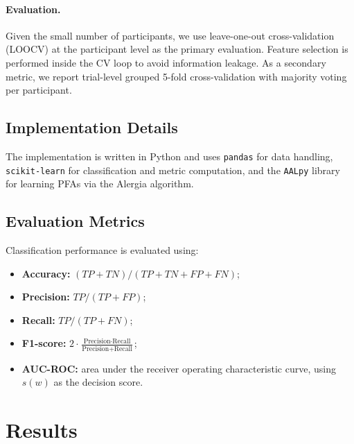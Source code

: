 \documentclass[sigconf]{acmart}
\theoremstyle{plain}
\theoremstyle{definition}
\begin{document}
\paragraph{Evaluation.}
Given the small number of participants, we use leave-one-out cross-validation (LOOCV) at the participant level as the primary evaluation.
Feature selection is performed inside the CV loop to avoid information leakage.
As a secondary metric, we report trial-level grouped 5-fold cross-validation with majority voting per participant.

\subsection{Implementation Details}

The implementation is written in Python and uses \texttt{pandas} for data handling, \texttt{scikit-learn} for classification and metric computation, and the \texttt{AALpy} library~\cite{muskardin2021} for learning PFAs via the Alergia algorithm.


\subsection{Evaluation Metrics}

Classification performance is evaluated using:
\begin{itemize}
    \item \textbf{Accuracy:} $(TP + TN) / (TP + TN + FP + FN)$;
    \item \textbf{Precision:} $TP / (TP + FP)$;
    \item \textbf{Recall:} $TP / (TP + FN)$;
    \item \textbf{F1-score:} $2 \cdot \frac{\text{Precision} \cdot \text{Recall}}{\text{Precision} + \text{Recall}}$;
    \item \textbf{AUC-ROC:} area under the receiver operating characteristic curve, using $s(w)$ as the decision score.
\end{itemize}

\section{Results}
\end{document}

